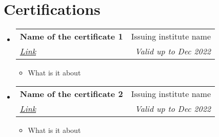 \documentclass[letterpaper,11pt]{article}
\makeatletter
\newcommand{\resumeItem}[1]{
  \item\small{
    {#1 \vspace{-2pt}}
  }
}
\newcommand{\resumeSubheading}[4]{
  \vspace{-2pt}\item
    \begin{tabular*}{0.97\textwidth}[t]{l@{\extracolsep{\fill}}r}
      \textbf{#1} & #2 \\
      \textit{\small#3} & \textit{\small #4} \\
    \end{tabular*}\vspace{-7pt}
}
\newcommand{\resumeSubHeadingListStart}{\begin{itemize}[leftmargin=0.15in, label={}]}
\newcommand{\resumeSubHeadingListEnd}{\end{itemize}}
\newcommand{\resumeItemListStart}{\begin{itemize}}
\newcommand{\resumeItemListEnd}{\end{itemize}\vspace{-5pt}}
\makeatother
\begin{document}
\section{Certifications}
  \resumeSubHeadingListStart

    \resumeSubheading
    {Name of the certificate 1}{Issuing institute name}
    {\href{https://example.com}{Link}}{Valid up to Dec 2022}

    \resumeItemListStart
        \resumeItem{What is it about}
    \resumeItemListEnd

    \resumeSubheading
    {Name of the certificate 2}{Issuing institute name}
    {\href{https://example.com}{Link}}{Valid up to Dec 2022}

    \resumeItemListStart
        \resumeItem{What is it about}
    \resumeItemListEnd

  \resumeSubHeadingListEnd
\end{document}
